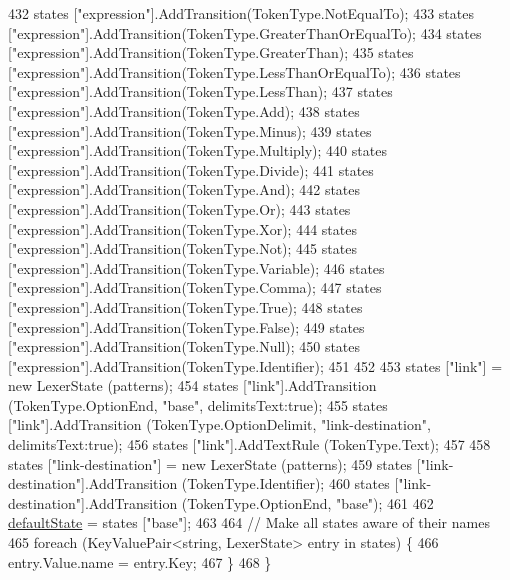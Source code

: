 \begin{DoxyCode}
432             states [\textcolor{stringliteral}{"expression"}].AddTransition(TokenType.NotEqualTo);
433             states [\textcolor{stringliteral}{"expression"}].AddTransition(TokenType.GreaterThanOrEqualTo);
434             states [\textcolor{stringliteral}{"expression"}].AddTransition(TokenType.GreaterThan);
435             states [\textcolor{stringliteral}{"expression"}].AddTransition(TokenType.LessThanOrEqualTo);
436             states [\textcolor{stringliteral}{"expression"}].AddTransition(TokenType.LessThan);
437             states [\textcolor{stringliteral}{"expression"}].AddTransition(TokenType.Add);
438             states [\textcolor{stringliteral}{"expression"}].AddTransition(TokenType.Minus);
439             states [\textcolor{stringliteral}{"expression"}].AddTransition(TokenType.Multiply);
440             states [\textcolor{stringliteral}{"expression"}].AddTransition(TokenType.Divide);
441             states [\textcolor{stringliteral}{"expression"}].AddTransition(TokenType.And);
442             states [\textcolor{stringliteral}{"expression"}].AddTransition(TokenType.Or);
443             states [\textcolor{stringliteral}{"expression"}].AddTransition(TokenType.Xor);
444             states [\textcolor{stringliteral}{"expression"}].AddTransition(TokenType.Not);
445             states [\textcolor{stringliteral}{"expression"}].AddTransition(TokenType.Variable);
446             states [\textcolor{stringliteral}{"expression"}].AddTransition(TokenType.Comma);
447             states [\textcolor{stringliteral}{"expression"}].AddTransition(TokenType.True);
448             states [\textcolor{stringliteral}{"expression"}].AddTransition(TokenType.False);
449             states [\textcolor{stringliteral}{"expression"}].AddTransition(TokenType.Null);
450             states [\textcolor{stringliteral}{"expression"}].AddTransition(TokenType.Identifier);
451 
452 
453             states [\textcolor{stringliteral}{"link"}] = \textcolor{keyword}{new} LexerState (patterns);
454             states [\textcolor{stringliteral}{"link"}].AddTransition (TokenType.OptionEnd, \textcolor{stringliteral}{"base"}, delimitsText:\textcolor{keyword}{true});
455             states [\textcolor{stringliteral}{"link"}].AddTransition (TokenType.OptionDelimit, \textcolor{stringliteral}{"link-destination"}, delimitsText:\textcolor{keyword}{true});
456             states [\textcolor{stringliteral}{"link"}].AddTextRule (TokenType.Text);
457 
458             states [\textcolor{stringliteral}{"link-destination"}] = \textcolor{keyword}{new} LexerState (patterns);
459             states [\textcolor{stringliteral}{"link-destination"}].AddTransition (TokenType.Identifier);
460             states [\textcolor{stringliteral}{"link-destination"}].AddTransition (TokenType.OptionEnd, \textcolor{stringliteral}{"base"});
461 
462             \hyperlink{a00099_a16b5dbf27a377cde5e8ba0eaa05b5710}{defaultState} = states [\textcolor{stringliteral}{"base"}];
463 
464             \textcolor{comment}{// Make all states aware of their names}
465             \textcolor{keywordflow}{foreach} (KeyValuePair<string, LexerState> entry \textcolor{keywordflow}{in} states) \{
466                 entry.Value.name = entry.Key;
467             \}
468         \}
\end{DoxyCode}
